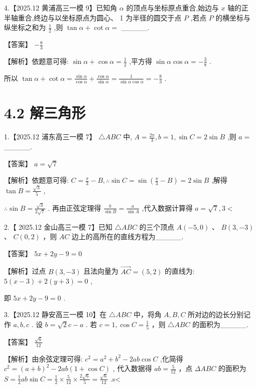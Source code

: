 \documentclass[10pt]{article}
\begin{document}
4.【2025.12 黄浦高三一模 9】已知角 \(\alpha\) 的顶点与坐标原点重合,始边与 \(x\) 轴的正半轴重合,终边与以坐标原点为圆心、 1 为半径的圆交于点 \(P\) ,若点 \(P\) 的横坐标与纵坐标之和为 \(\frac{1}{2}\) ,则 \(\tan \alpha  + \cot \alpha  =\) \_\_\_\_\_.

【答案】 \(- \frac{8}{3}\)

【解析】依题意可得: \(\sin \alpha  + \cos \alpha  = \frac{1}{2}\) ,平方得 \(\sin \alpha \cos \alpha  =  - \frac{3}{8}\) .

所以 \(\tan \alpha  + \cot \alpha  = \frac{\sin \alpha }{\cos \alpha } + \frac{\cos \alpha }{\sin \alpha } = \frac{1}{\sin \alpha \cos \alpha } =  - \frac{8}{3}\) .

\section*{4.2 解三角形}

1.【2025.12 浦东高三一模 7】 \(\bigtriangleup {ABC}\) 中, \(A = \frac{2\pi }{3},b = 1,\sin C = 2\sin B\) ,则 \(a =\) \_\_\_\_\_.

【答案】 \(a = \sqrt{7}\)

【解析】依题意可得: \(C = \frac{\pi }{3} - B,\therefore \sin C = \sin \left( {\frac{\pi }{3} - B}\right)  = 2\sin B\) ,解得 \(\tan B = \frac{\sqrt{3}}{5}\) ,

\(\therefore \sin B = \frac{\sqrt{3}}{2\sqrt{7}}\) . 再由正弦定理得 \(\frac{b}{\sin B} = \frac{a}{\sin A}\) ,代入数据计算得 \(a = \sqrt{7},3 <\)

2.【 2025.12 金山高三一模 7】已知 \(\bigtriangleup  {ABC}\) 的三个顶点 \(A\left( {-5,0}\right)\) 、 \(B\left( {3, - 3}\right)\) 、 \(C\left( {0,2}\right)\) ，则 \({AC}\) 边上的高所在的直线方程为\_\_\_\_\_.

【答案】 \({5x} + {2y} - 9 = 0\)

【解析】过点 \(B\left( {3, - 3}\right)\) 且法向量为 \(\overrightarrow{AC} = \left( {5,2}\right)\) 的直线为: \(5\left( {x - 3}\right)  + 2\left( {y + 3}\right)  = 0\) ,

即 \({5x} + {2y} - 9 = 0\) .

3.【2025.12 静安高三一模 10】在 \(\bigtriangleup  {ABC}\) 中，将角 \(A,B,C\) 所对边的边长分别记作 \(a,b,c\) . 设 \(b = \sqrt{2}c - a\) . 若 \(c = 1,\cos C = \frac{1}{5}\) ，则 \(\bigtriangleup  {ABC}\) 的面积为\_\_\_\_\_.

【答案】 \(\frac{\sqrt{6}}{12}\)

【解析】由余弦定理可得: \({c}^{2} = {a}^{2} + {b}^{2} - {2ab}\cos C\) ,化简得 \({c}^{2} = {\left( a + b\right) }^{2} - {2ab}\left( {1 + \cos C}\right)\) , 代入数据得 \({ab} = \frac{5}{12}\) ，点 \({\Delta ABC}\) 的面积为 \(S = \frac{1}{2}{ab}\sin C = \frac{1}{2} \times  \frac{5}{12} \times  \frac{2\sqrt{6}}{5} = \frac{\sqrt{6}}{12}\) .s<
\end{document}
